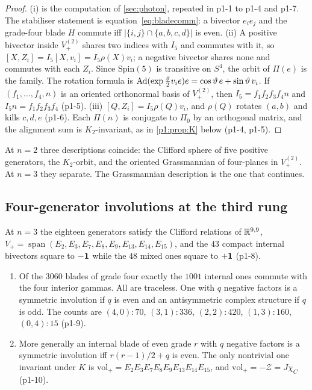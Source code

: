 \begin{proof}
(i) is the computation of \cref{sec:photon}, repeated in p1-1 to p1-4 and p1-7. The stabiliser statement is equation~\cref{eq:bladecomm}: a bivector $e_ie_j$ and the grade-four blade $H$ commute iff $|\{i,j\}\cap\{a,b,c,d\}|$ is even. (ii) A positive bivector inside $V_+^{(2)}$ shares two
indices with $I_5$ and commutes with it, so $[X,Z_i]=I_5[X,v_i]=I_5\rho(X)v_i$; a negative bivector shares none and commutes with each $Z_i$. Since $\mathrm{Spin}(5)$ is
transitive on $S^4$, the orbit of $\Pi(e)$ is the family. The rotation formula is $\operatorname{Ad}(\exp\tfrac\vartheta2v_ie)e=\cos\vartheta\,e+\sin\vartheta\,v_i$.
If $(f_1,\dots,f_4,n)$ is an oriented orthonormal basis of $V_+^{(2)}$, then $I_5=f_1f_2f_3f_4n$ and $I_5n=f_1f_2f_3f_4$ (p1-5). (iii) $[Q,Z_i]=I_5\rho(Q)v_i$, and
$\rho(Q)$ rotates $(a,b)$ and kills $c,d,e$ (p1-6). Each $\Pi(n)$ is conjugate to $\Pi_0$ by an orthogonal matrix, and the alignment sum is $K_2$-invariant, as in
\cref{p1:prop:K} below (p1-4, p1-5).
\end{proof}

At $n=2$ three descriptions coincide: the Clifford sphere of five positive generators, the $K_2$-orbit, and the oriented Grassmannian of four-planes in
$V_+^{(2)}$. At $n=3$ they separate. The Grassmannian description is the one that continues.

\subsection{Four-generator involutions at the third rung}
\label{p1:sec:classify}

\begin{lemma}
\label{p1:lem:census}
At $n=3$ the eighteen generators satisfy the Clifford relations of $\mathbb{R}^{9,9}$, $V_+=\operatorname{span}(E_2,E_3,E_7,E_8,E_9,E_{13},E_{14},E_{15})$, and the $43$ compact
internal bivectors square to $-\mathbf 1$ while the $48$ mixed ones square to $+\mathbf 1$ (p1-8).
\begin{enumerate}[label=(\roman*),leftmargin=2.2em]
\item Of the $3060$ blades of grade four exactly the $1001$ internal ones commute with the four interior gammas. All are traceless. One with $q$ negative factors is
a symmetric involution if $q$ is even and an antisymmetric complex structure if $q$ is odd. The counts are $(4,0):70$, $(3,1):336$, $(2,2):420$, $(1,3):160$, $(0,4):15$
(p1-9).
\item More generally an internal blade of even grade $r$ with $q$ negative factors is a symmetric involution iff $r(r-1)/2+q$ is even. The only nontrivial one invariant
under $K$ is $\mathrm{vol}_+=E_2E_3E_7E_8E_9E_{13}E_{14}E_{15}$, and $\mathrm{vol}_+=-\mathcal Z=J\chi_C$ (p1-10).
\end{enumerate}
\end{lemma}


